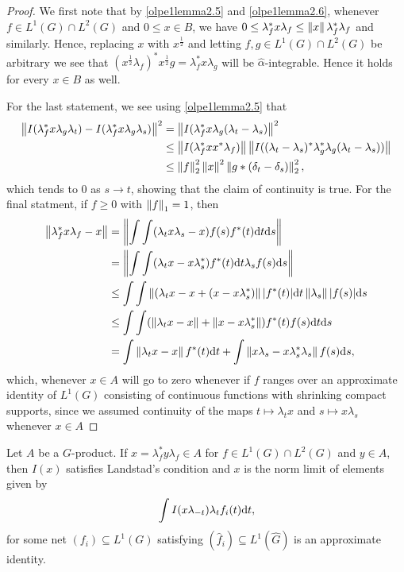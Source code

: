 \begin{proof}
	We first note that by \cref{olpe1lemma2.5} and \cref{olpe1lemma2.6}, whenever $f\in L^1(G) \cap L^2(G)$ and $0 \leq x \in B$, we have $0 \leq \lambda_f^* x \lambda_f \leq \left\lVert x \right\rVert \lambda_f^* \lambda_f$ and similarly. Hence, replacing $x$ with $x^{\frac12}$ and letting $f,g \in L^1(G) \cap L^2(G)$ be arbitrary we see that $( x^{\frac12}\lambda_f)^* x^{\frac12} g  = \lambda_f^* x \lambda_g$ will be $\hat \alpha$-integrable. Hence it holds for every $x \in B$ as well.

	For the last statement, we see using \cref{olpe1lemma2.5} that
	\begin{align*}
		\left\lVert I(\lambda_f^* x \lambda_g \lambda_t) - I(\lambda_f^* x \lambda_g \lambda_s)\right\rVert^2 &= \left\lVert I(\lambda_f^* x \lambda_g(\lambda_t-\lambda_s)\right\rVert^2 \\
		&\leq \left\lVert I(\lambda_f^* x x^* \lambda_f)\right\rVert  \left\lVert I( ( \lambda_t - \lambda_s)^* \lambda_g^* \lambda_g ( \lambda_t - \lambda_s))\right\rVert \\
		&\leq \left\lVert f \right\rVert _ 2^2 \left\lVert x \right\rVert ^2 \left\lVert g \ast(\delta_{t}-\delta_s) \right\rVert_2^2,
	\end{align*}
	which tends to $0$ as $s \to t$, showing that the claim of continuity is true. For the final statment, if $f \geq 0$ with $\left\lVert f \right\rVert_1 = 1$, then
	\begin{align*}
		\left\lVert \lambda_f^* x \lambda_f - x \right\rVert &= \left\lVert \int \int (\lambda_t x \lambda_s-x) f(s) f^*(t) \mathrm{d} t \mathrm{d} s \right\rVert \\
	&= \left\lVert \int \int (\lambda_t x  - x \lambda_s^*)f^*(t) \mathrm{d} t \lambda_s f(s) \mathrm{d} s \right\rVert\\
	&\leq \int \int \left\lVert ( \lambda_t x -x + (x-x\lambda_s^* )\right\rVert |f^*(t)| \mathrm{d} t \left\lVert\lambda_s \right\rVert |f(s)| \mathrm{d} s \\
	&\leq \int \int (\left\lVert \lambda_t x - x \right\rVert + \left\lVert  x -x\lambda_s^* \right\rVert)  f^*(t) f(s) \mathrm{d} t \mathrm{d} s\\
	&= \int \left\lVert \lambda_t x -x \right\rVert f^*(t) \mathrm{d} t + \int \left\lVert x \lambda_s - x \lambda_s^* \lambda_s \right\rVert f(s) \mathrm{d} s,
	\end{align*}
	which, whenever $x \in A$ will go to zero whenever if $f$ ranges over an approximate identity of $L^1(G)$ consisting of continuous functions with shrinking compact supports, since we assumed continuity of the maps $t \mapsto \lambda_t x$ and $s \mapsto x \lambda_s$ whenever $x \in A$
\end{proof}
\begin{proposition}
	Let $A$ be a $G$-product. If $x = \lambda_f^* y \lambda_f \in A$ for $f \in L^1(G) \cap L^2(G)$ and $y \in A$, then $I(x)$ satisfies Landstad's condition and $x$ is the norm limit of elements given by 
	\begin{align*}
		\int I(x \lambda_{-t}) \lambda_t f_i(t) \mathrm{d} t,
	\end{align*}
	for some net $(f_i) \subseteq L^1(G)$ satisfying $(\hat f_i) \subseteq L^1(\hat G)$ is an approximate identity.
	\label{olpe1lemma2.8}
\end{proposition}
